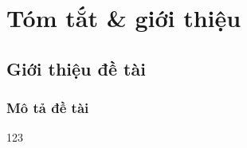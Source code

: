 \chapter{Tóm tắt \& giới thiệu}
\minitoc
\newpage
\section{Giới thiệu đề tài}
\subsection{Mô tả đề tài}
123